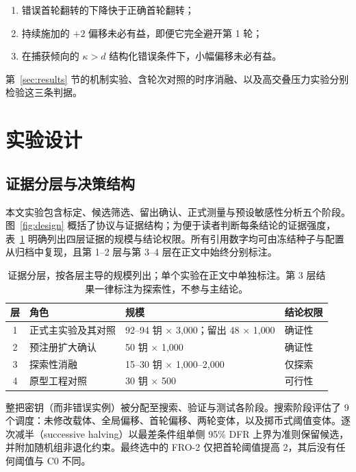 \documentclass[UTF8,a4paper,10pt,twocolumn]{ctexart}
\begin{document}
\begin{enumerate}[label=(\roman*),leftmargin=1.8em,itemsep=0.12em,topsep=0.25em]
\item 错误首轮翻转的下降快于正确首轮翻转；
\item 持续施加的 $+2$ 偏移未必有益，即便它完全避开第 1 轮；
\item 在捕获倾向的 $\kappa>d$ 结构化错误条件下，小幅偏移未必有益。
\end{enumerate}

第~\ref{sec:results} 节的机制实验、含轮次对照的时序消融、以及高交叠压力实验分别检验这三条判据。

\section{实验设计}\label{sec:method}

\subsection{证据分层与决策结构}

本文实验包含标定、候选筛选、留出确认、正式测量与预设敏感性分析五个阶段。图~\ref{fig:design} 概括了协议与证据结构；为便于读者判断每条结论的证据强度，表~\ref{tab:tiers} 明确列出四层证据的规模与结论权限。所有引用数字均可由冻结种子与配置从归档中复现，且第 1--2 层与第 3--4 层在正文中始终分别标注。

\begin{table}[t]
\centering
\caption{证据分层，按各层主导的规模列出；单个实验在正文中单独标注。第 3 层结果一律标注为探索性，不参与主结论。}
\label{tab:tiers}
\fontsize{6.2}{7.4}\selectfont
\setlength{\tabcolsep}{3pt}
\begin{tabular}{@{}clll@{}}
\toprule
层 & 角色 & 规模 & 结论权限 \\
\midrule
1 & 正式主实验及其对照 & 92--94 钥 $\times$ 3{,}000；留出 48 $\times$ 1{,}000 & 确证性 \\
2 & 预注册扩大确认 & 50 钥 $\times$ 1{,}000 & 确证性 \\
3 & 探索性消融 & 15--30 钥 $\times$ 1{,}000--2{,}000 & 仅探索 \\
4 & 原型工程对照 & 30 钥 $\times$ 500 & 可行性 \\
\bottomrule
\end{tabular}
\end{table}

整把密钥（而非错误实例）被分配至搜索、验证与测试各阶段。搜索阶段评估了 9 个调度：未修改载体、全局偏移、首轮偏移、两轮变体，以及掷币式阈值变体。逐次减半（successive halving）以最差条件组单侧 95\% DFR 上界为准则保留候选，并附加随机组非退化约束。最终选中的 FRO-2 仅把首轮阈值提高 2，其后没有任何阈值与 C0 不同。
\end{document}

